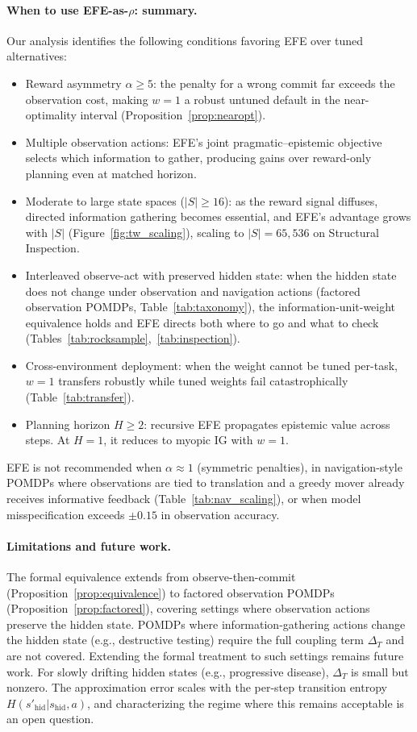 \documentclass[runningheads]{llncs}
\begin{document}
\paragraph{When to use EFE-as-$\rho$: summary.}
Our analysis identifies the following conditions favoring EFE over tuned alternatives:
\begin{itemize}[leftmargin=1.5em,itemsep=1pt,topsep=2pt]
\item Reward asymmetry $\alpha \geq 5$: the penalty for a wrong commit far exceeds the observation cost, making $w{=}1$ a robust untuned default in the near-optimality interval (Proposition~\ref{prop:nearopt}).
\item Multiple observation actions: EFE's joint pragmatic--epistemic objective selects which information to gather, producing gains over reward-only planning even at matched horizon.
\item Moderate to large state spaces ($|S| \geq 16$): as the reward signal diffuses, directed information gathering becomes essential, and EFE's advantage grows with $|S|$ (Figure~\ref{fig:tw_scaling}), scaling to $|S|{=}65{,}536$ on Structural Inspection.
\item Interleaved observe-act with preserved hidden state: when the hidden state does not change under observation and navigation actions (factored observation POMDPs, Table~\ref{tab:taxonomy}), the information-unit-weight equivalence holds and EFE directs both where to go and what to check (Tables~\ref{tab:rocksample},~\ref{tab:inspection}).
\item Cross-environment deployment: when the weight cannot be tuned per-task, $w{=}1$ transfers robustly while tuned weights fail catastrophically (Table~\ref{tab:transfer}).
\item Planning horizon $H \geq 2$: recursive EFE propagates epistemic value across steps. At $H{=}1$, it reduces to myopic IG with $w{=}1$.
\end{itemize}
EFE is not recommended when $\alpha \approx 1$ (symmetric penalties), in navigation-style POMDPs where observations are tied to translation and a greedy mover already receives informative feedback (Table~\ref{tab:nav_scaling}), or when model misspecification exceeds $\pm 0.15$ in observation accuracy.

\paragraph{Limitations and future work.}
The formal equivalence extends from observe-then-commit (Proposition~\ref{prop:equivalence}) to factored observation POMDPs (Proposition~\ref{prop:factored}), covering settings where observation actions preserve the hidden state. POMDPs where information-gathering actions change the hidden state (e.g., destructive testing) require the full coupling term $\Delta_T$ and are not covered. Extending the formal treatment to such settings remains future work. For slowly drifting hidden states (e.g., progressive disease), $\Delta_T$ is small but nonzero. The approximation error scales with the per-step transition entropy $H(s'_{\mathrm{hid}} | s_{\mathrm{hid}}, a)$, and characterizing the regime where this remains acceptable is an open question.
\end{document}

